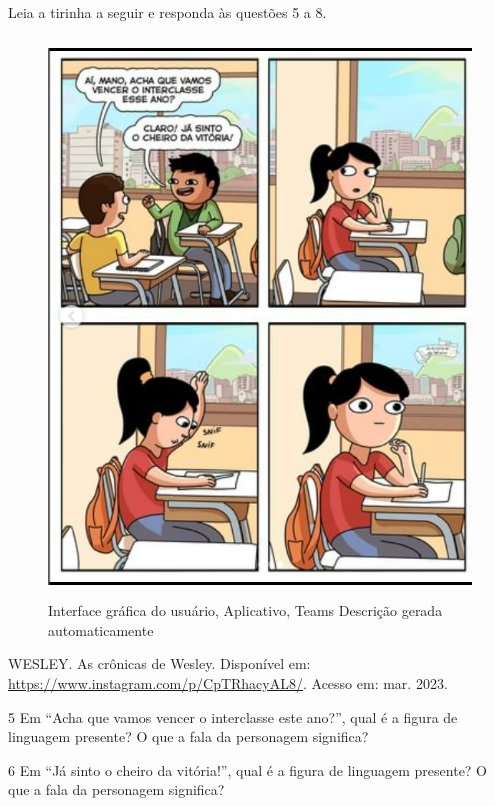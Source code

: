 {


Leia a tirinha a seguir e responda às questões 5 a 8.

\begin{figure}
\centering
\includegraphics[width=4.60873in,height=5.83384in]{./imgSAEB_6_POR/media/image28.png}
\caption{Interface gráfica do usuário, Aplicativo, Teams Descrição
gerada automaticamente}
\end{figure}

WESLEY. As crônicas de Wesley. Disponível em:
\url{https://www.instagram.com/p/CpTRhacyAL8/}. Acesso em: mar. 2023.

\num{5} Em ``Acha que vamos vencer o interclasse este ano?'', qual é a
figura de linguagem presente? O que a fala da personagem significa?



\num{6} Em ``Já sinto o cheiro da vitória!'', qual é a figura de
linguagem presente? O que a fala da personagem significa?

}
